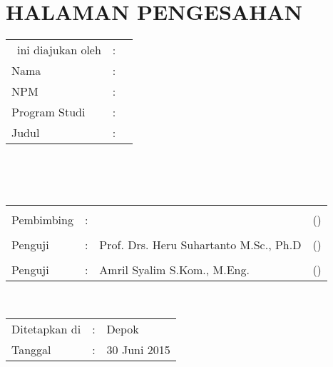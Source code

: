 \underline{}%
%
%

\chapter*{HALAMAN PENGESAHAN}

\vspace*{0.4cm}
\noindent 

\noindent
\begin{tabular}{ll p{9cm}}
	\type~ini diajukan oleh&: & \\
	Nama&: & \penulis \\
	NPM&: & \npm \\
	Program Studi&: & \program \\
	Judul \type&: & \judul \\
\end{tabular} \\

\vspace*{1.0cm}

\noindent {}\\[0.2cm]

\begin{center}
\end{center}

\vspace*{0.3cm}

\begin{tabular}{l l l l }
	& & & \\
	Pembimbing&: & \pembimbing & (\hspace*{3.0cm}) \\
	& & & \\
	Penguji&: & Prof. Drs. Heru Suhartanto M.Sc., Ph.D & (\hspace*{3.0cm})\\
	& & & \\
	Penguji&: & Amril Syalim S.Kom., M.Eng. & (\hspace*{3.0cm})\\
\end{tabular}\\


\vspace*{2.0cm}

\begin{tabular}{ll l}
	Ditetapkan di&: & Depok\\
	Tanggal&: & 30 Juni 2015 \\
\end{tabular}


\newpage
